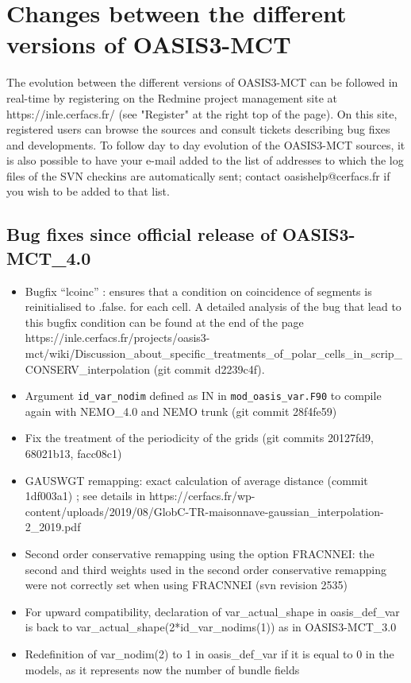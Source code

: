 \newpage

\chapter{Changes between the different versions of OASIS3-MCT}
\label{sec_changes}

The evolution between the different versions of OASIS3-MCT can be
followed in real-time by registering on the Redmine project management
site at https://inle.cerfacs.fr/ (see "Register" at the right top of
the page). On this site, registered users can browse the sources and
consult tickets describing bug fixes and developments. To follow day
to day evolution of the OASIS3-MCT sources, it is also possible to
have your e-mail added to the list of addresses to which the log files
of the SVN checkins are automatically sent; contact
oasishelp@cerfacs.fr if you wish to be added to that list.

\section{Bug fixes since official release of OASIS3-MCT\_4.0}

\begin{itemize}

\item Bugfix ``lcoinc''  : ensures that a condition on coincidence of segments is reinitialised to .false. for each cell. A detailed analysis of the bug that lead to this bugfix condition can be found at the end of the page 
https://inle.cerfacs.fr/projects/oasis3-mct/wiki/Discussion\_about\_specific\_treatments\_of\_polar\_cells\_in\_scrip\_CONSERV\_interpolation (git commit d2239c4f).

\item Argument {\tt id\_var\_nodim} defined as IN in {\tt mod\_oasis\_var.F90} to compile again with NEMO\_4.0 and NEMO trunk (git commit 28f4fe59) 

\item Fix the treatment of the periodicity of the grids (git commits 20127fd9, 68021b13, facc08c1)

\item GAUSWGT remapping: exact calculation of average distance (commit 1df003a1) ; see details in https://cerfacs.fr/wp-content/uploads/2019/08/GlobC-TR-maisonnave-gaussian\_interpolation-2\_2019.pdf

 \item Second order conservative remapping using the option FRACNNEI: the second and third weights used in the second order conservative remapping were not correctly set when using FRACNNEI (svn revision 2535)

\item For upward compatibility, declaration of var\_actual\_shape in oasis\_def\_var is back to var\_actual\_shape(2*id\_var\_nodims(1)) as in OASIS3-MCT\_3.0

\item Redefinition of var\_nodim(2) to 1 in oasis\_def\_var if it is equal to 0 in the models, as it represents now the number of bundle fields

\end{itemize}

